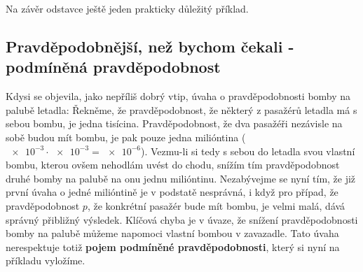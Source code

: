       Na závěr odstavce ještě jeden prakticky důležitý příklad.
      
      

    \subsection{Pravděpodobnější, než bychom čekali - podmíněná pravděpodobnost}
      Kdysi se objevila, jako nepříliš dobrý vtip, úvaha o pravděpodobnosti bomby na palubě letadla:
      Řekněme, že pravděpodobnost, že některý z pasažérů letadla má s sebou bombu, je jedna
      tisícina. Pravděpodobnost, že dva pasažéři nezávisle na sobě budou mít bombu, je pak pouze
      jedna milióntina (\(\num{e-3}\cdot\num{e-3}= \num{e-6}\)). Vezmu-li si tedy s sebou do 
      letadla svou vlastní bombu, kterou ovšem nehodlám uvést do chodu, snížím tím pravděpodobnost 
      druhé bomby na palubě na onu jednu milióntinu. Nezabývejme se nyní tím, že již první úvaha o 
      jedné milióntině je v podstatě nesprávná, i když pro případ, že pravděpodobnost \(p\), že 
      konkrétní pasažér bude mít bombu, je velmi malá, dává správný přibližný výsledek. Klíčová 
      chyba je v úvaze, že snížení pravděpodobnosti bomby na palubě můžeme napomoci vlastní bombou 
      v zavazadle. Tato úvaha nerespektuje totiž \textbf{pojem podmíněné pravděpodobnosti}, který 
      si nyní na příkladu vyložíme.
      
      
      
      
      
      
      
      
      
      
      
      
      
      
      
      
      
      
      
      
      
      
      
      
      
